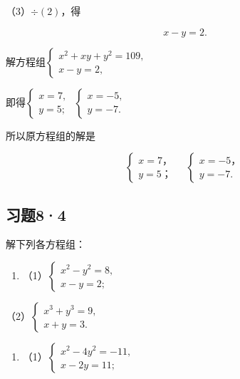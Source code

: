 （3）\(\div (2)\)，得

\[
x - y = 2. \tag{4}
\]

解方程组\(\left\{ \begin{array}{l} x^{2} + xy + y^{2} = 109, \\ x - y = 2, \end{array} \right.\)

即得\(\left\{ \begin{array}{l} x = 7, \\ y = 5; \end{array} \right.\) \(\left\{ \begin{array}{l} x = -5, \\ y = -7. \end{array} \right.\)

所以原方程组的解是

\[
\left\{ \begin{array}{l} x = 7\text{，} \\ y = 5\text{；} \end{array} \right. \quad \left\{ \begin{array}{l} x = - 5\text{，} \\ y = - 7. \end{array} \right.
\]

\subsection{习题8·4}

解下列各方程组：

\begin{enumerate}
\item
  （1）\(\left\{ \begin{array}{l} x^{2} - y^{2} = 8, \\ x - y = 2; \end{array} \right.\)
\end{enumerate}

（2）\(\left\{ \begin{array}{l} x^{3} + y^{3} = 9, \\ x + y = 3. \end{array} \right.\)

\begin{enumerate}[start=2]
\item
  （1）\(\left\{ \begin{array}{l} x^{2} - 4y^{2} = -11, \\ x - 2y = 11; \end{array} \right.\)
\end{enumerate}

